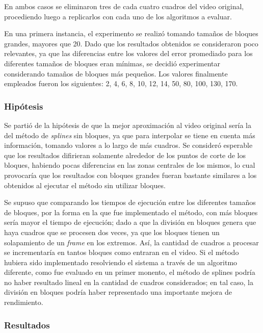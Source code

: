             En ambos casos se eliminaron tres de cada cuatro cuadros del video original, procediendo luego a replicarlos con cada uno de los algoritmos a evaluar.

            En una primera instancia, el experimento se realizó tomando tamaños de bloques grandes, mayores que 20. Dado que los resultados obtenidos se consideraron poco relevantes, ya que las diferencias entre los valores del error promediado para los diferentes tamaños de bloques eran mínimas, se decidió experimentar considerando tamaños de bloques más pequeños. Los valores finalmente empleados fueron los siguientes: 2, 4, 6, 8, 10, 12, 14, 50, 80, 100, 130, 170.

            \subsubsection*{Hipótesis}

            Se partió de la hipótesis de que la mejor aproximación al video original sería la del método de \emph{splines} sin bloques, ya que para interpolar se tiene en cuenta más información, tomando valores a lo largo de más cuadros. Se consideró esperable que los resultados difirieran solamente alrededor de los puntos de corte de los bloques, habiendo pocas diferencias en las zonas centrales de los mismos, lo cual provocaría que los resultados con bloques grandes fueran bastante similares a los obtenidos al ejecutar el método sin utilizar bloques.

            Se supuso que comparando los tiempos de ejecución entre los diferentes tamaños de bloques, por la forma en la que fue implementado el método, con más bloques sería mayor el tiempo de ejecución; dado a que la división en bloques genera que haya cuadros que se procesen dos veces, ya que los bloques tienen un solapamiento de un \emph{frame} en los extremos. Así, la cantidad de cuadros a procesar se incrementaría en tantos bloques como entraran en el video. Si el método hubiera sido implementado resolviendo el sistema a través de un algoritmo diferente, como fue evaluado en un primer monento, el método de splines podría no haber resultado lineal en la cantidad de cuadros considerados; en tal caso, la división en bloques podría haber representado una importante mejora de rendimiento.

            \subsubsection*{Resultados}


